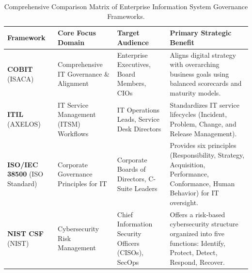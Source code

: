 \documentclass[11pt,a4paper]{article}
\begin{document}
\begin{table}[htbp]
\centering
\small
\renewcommand{\arraystretch}{1.25}
\begin{tabularx}{\textwidth}{L{2.4cm} L{3.0cm} L{3.0cm} Y}
\toprule
{}
\textbf{Framework} & \textbf{Core Focus Domain} & \textbf{Target Audience} & \textbf{Primary Strategic Benefit} \\
\midrule
\textbf{COBIT} \newline (ISACA) & Comprehensive IT Governance \& Alignment & Enterprise Executives, Board Members, CIOs & Aligns digital strategy with overarching business goals using balanced scorecards and maturity models. \\
\textbf{ITIL} \newline (AXELOS) & IT Service Management (ITSM) Workflows & IT Operations Leads, Service Desk Directors & Standardizes IT service lifecycles (Incident, Problem, Change, and Release Management). \\
\textbf{ISO/IEC 38500} \newline (ISO Standard) & Corporate Governance Principles for IT & Corporate Boards of Directors, C-Suite Leaders & Provides six principles (Responsibility, Strategy, Acquisition, Performance, Conformance, Human Behavior) for IT oversight. \\
\textbf{NIST CSF} \newline (NIST) & Cybersecurity Risk Management & Chief Information Security Officers (CISOs), SecOps & Offers a risk-based cybersecurity structure organized into five functions: Identify, Protect, Detect, Respond, Recover. \\
\bottomrule
\end{tabularx}
\caption{Comprehensive Comparison Matrix of Enterprise Information System Governance Frameworks.}
\label{tab:governance_matrix}
\end{table}
\end{document}
